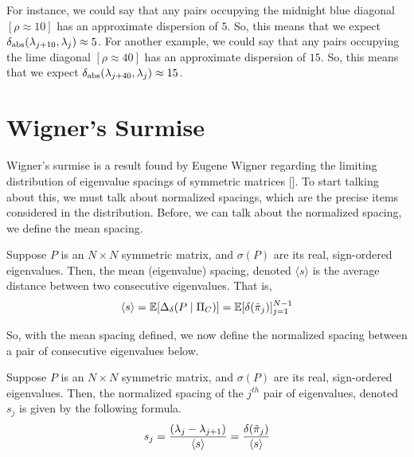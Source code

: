 For instance, we could say that any pairs occupying the midnight blue diagonal $[\rho \approx 10]$ has an approximate dispersion of $5$.
So, this means that we expect $\delta_{\text{abs}}(\lambda_{j + 10}, \lambda_j) \approx 5$. For another example, we could say that any pairs occupying the lime diagonal $[\rho \approx 40]$ has an approximate dispersion of $15$.
So, this means that we expect $\delta_{\text{abs}}(\lambda_{j + 40}, \lambda_j) \approx 15$.

%
%

\newpage
\section{Wigner's Surmise}


Wigner's surmise is a result found by Eugene Wigner regarding the limiting distribution of eigenvalue spacings of symmetric matrices [\cite{mahta}].
To start talking about this, we must talk about normalized spacings, which are the precise items considered in the distribution.
Before, we can talk about the normalized spacing, we define the mean spacing.

\begin{definition}
Suppose $P$ is an $N \times N$ symmetric matrix, and $\sigma(P)$ are its real, sign-ordered eigenvalues.
Then, the mean (eigenvalue) spacing, denoted $\langle s \rangle$ is the average distance between two consecutive eigenvalues. That is,
$$\langle s \rangle = \mathbb{E}[\Delta_\delta(P \mid \Pi_C)] = \mathbb{E}[\delta({\tilde{\pi}}_{j})]_{j = 1}^{N - 1}$$
\end{definition}

\noindent So, with the mean spacing defined, we now define the normalized spacing between a pair of consecutive eigenvalues below.

\begin{definition}
Suppose $P$ is an $N \times N$ symmetric matrix, and $\sigma(P)$ are its real, sign-ordered eigenvalues.
Then, the normalized spacing of the $j^{th}$ pair of eigenvalues, denoted $s_j$ is given by the following formula.
$$s_j = \frac{(\lambda_j - \lambda_{j+1})}{{\langle s \rangle}} = \frac{\delta({\tilde{\pi}}_{j})}{\langle s \rangle}$$
\end{definition}

